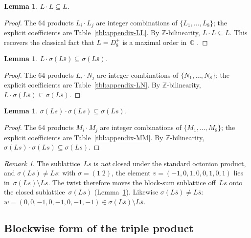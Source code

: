 \documentclass[twoside,english]{paper}
\numberwithin{equation}{section}
\numberwithin{figure}{section}
\newtheorem{lemma}[theorem]{Lemma}
\theoremstyle{definition}
\theoremstyle{remark}
\newtheorem{remark}[theorem]{Remark}
\newcommand{\OO}{\mathbb{O}}          %
\newcommand{\ZZ}{\mathbb{Z}}
\begin{document}
\begin{lemma}\label{lem:L-order}
$L \cdot L \subseteq L$.
\end{lemma}

\begin{proof}
The 64 products $L_i \cdot L_j$ are integer combinations of
$\{L_1,\ldots,L_8\}$; the explicit coefficients are
Table~\ref{tbl:appendix-LL}.  By $\ZZ$-bilinearity, $L \cdot L
\subseteq L$.  This recovers the classical fact that $L = D_8^+$ is
a maximal order in~$\OO$ \cite{Coxeter1946, ConwaySmith2003}.
\end{proof}

\begin{lemma}\label{lem:L-sigmaLsbar}
$L \cdot \sigma(L\bar{s}) \subseteq \sigma(L\bar{s})$.
\end{lemma}

\begin{proof}
The 64 products $L_i \cdot N_j$ are integer combinations of
$\{N_1,\ldots,N_8\}$; the explicit coefficients are
Table~\ref{tbl:appendix-LN}.  By $\ZZ$-bilinearity,
$L \cdot \sigma(L\bar s) \subseteq \sigma(L\bar s)$.
\end{proof}

\begin{lemma}\label{lem:sigmaLs-closed}
$\sigma(Ls) \cdot \sigma(Ls) \subseteq \sigma(Ls)$.
\end{lemma}

\begin{proof}
The 64 products $M_i \cdot M_j$ are integer combinations of
$\{M_1,\ldots,M_8\}$; the explicit coefficients are
Table~\ref{tbl:appendix-MM}.  By $\ZZ$-bilinearity,
$\sigma(Ls) \cdot \sigma(Ls) \subseteq \sigma(Ls)$.
\end{proof}

\begin{remark}\label{rem:Ls-not-closed}
The sublattice~$Ls$ is \emph{not} closed under the standard octonion
product, and $\sigma(Ls) \ne Ls$: with $\sigma = (1\;2)$, the
element $v = (-1, 0, 1, 0, 0, 1, 0, 1)$ lies in~$\sigma(Ls)
\setminus Ls$.  The twist therefore moves the block-sum sublattice
off~$Ls$ onto the closed sublattice~$\sigma(Ls)$
(Lemma~\ref{lem:sigmaLs-closed}).  Likewise $\sigma(L\bar s) \ne
L\bar s$: $w = (0, 0, -1, 0, -1, 0, -1, -1) \in \sigma(L\bar s)
\setminus L\bar s$.
\end{remark}

\subsection{Blockwise form of the triple product}
\end{document}
